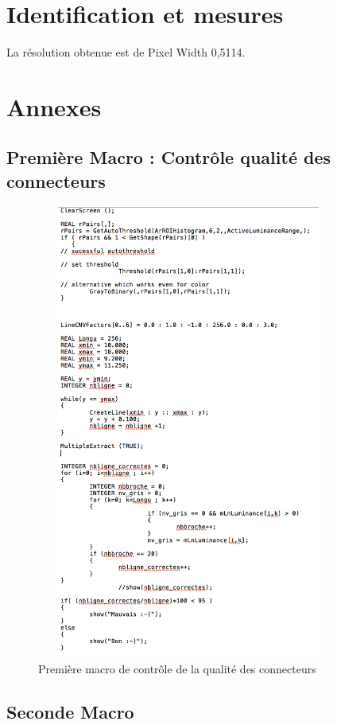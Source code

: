 \documentclass{scrreprt}
\begin{document}
\chapter{Identification et mesures}

La résolution obtenue est de Pixel Width 0,5114.


\chapter{Annexes}

\section{Première Macro : Contrôle qualité des connecteurs}

\begin{figure}[!h]
\centering
\includegraphics[width=10cm, height=15cm]{images/first.png}
\caption{Première macro de contrôle de la qualité des connecteurs}
\end{figure}


\newpage
\section{Seconde Macro}
\end{document}
